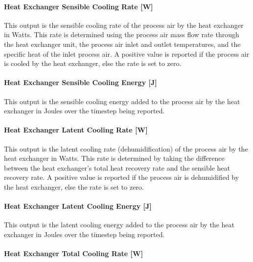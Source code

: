 \paragraph{Heat Exchanger Sensible Cooling Rate {[}W{]}}\label{heat-exchanger-sensible-cooling-rate-w-2}

This output is the sensible cooling rate of the process air by the heat exchanger in Watts. This rate is determined using the process air mass flow rate through the heat exchanger unit, the process air inlet and outlet temperatures, and the specific heat of the inlet process air. A positive value is reported if the process air is cooled by the heat exchanger, else the rate is set to zero.

\paragraph{Heat Exchanger Sensible Cooling Energy {[}J{]}}\label{heat-exchanger-sensible-cooling-energy-j-2}

This output is the sensible cooling energy added to the process air by the heat exchanger in Joules over the timestep being reported.

\paragraph{Heat Exchanger Latent Cooling Rate {[}W{]}}\label{heat-exchanger-latent-cooling-rate-w-2}

This output is the latent cooling rate (dehumidification) of the process air by the heat exchanger in Watts. This rate is determined by taking the difference between the heat exchanger's total heat recovery rate and the sensible heat recovery rate. A positive value is reported if the process air is dehumidified by the heat exchanger, else the rate is set to zero.

\paragraph{Heat Exchanger Latent Cooling Energy {[}J{]}}\label{heat-exchanger-latent-cooling-energy-j-2}

This output is the latent cooling energy added to the process air by the heat exchanger in Joules over the timestep being reported.

\paragraph{Heat Exchanger Total Cooling Rate {[}W{]}}\label{heat-exchanger-total-cooling-rate-w-2}

